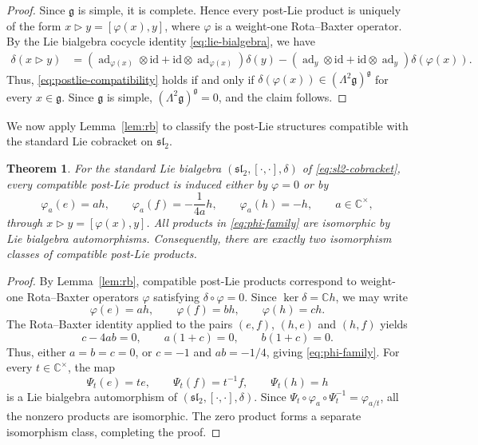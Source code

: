 \documentclass[11pt,english]{article}
\newcommand{\id}{\mathrm{id}}
\newcommand{\tri}{\mathbin{\triangleright}}
\newtheorem{theorem}[lemma]{Theorem}
\theoremstyle{definition}
\begin{document}
\begin{proof}
Since $\mathfrak g$ is simple, it is complete.
Hence every post-Lie product is uniquely of the form
$x\tri y=[\varphi(x),y]$, where $\varphi$ is a
weight-one Rota--Baxter operator.
By the Lie bialgebra cocycle identity
\eqref{eq:lie-bialgebra}, we have
\[
\begin{aligned}
\delta(x\tri y)
&=(\operatorname{ad}_{\varphi(x)}\otimes\id
+\id\otimes\operatorname{ad}_{\varphi(x)})
\delta(y)-
(\operatorname{ad}_y\otimes\id
+\id\otimes\operatorname{ad}_y)
\delta(\varphi(x)).
\end{aligned}
\]
Thus, \eqref{eq:postlie-compatibility} holds
if and only if
$\delta(\varphi(x))\in
(\Lambda^2\mathfrak g)^{\mathfrak g}$
for every $x\in\mathfrak g$.
Since $\mathfrak g$ is simple,
$(\Lambda^2\mathfrak g)^{\mathfrak g}=0$,
and the claim follows.
\end{proof}

We now apply Lemma~\ref{lem:rb} to classify
the post-Lie structures compatible with the
standard Lie cobracket on $\mathfrak{sl}_2$.

\begin{theorem}\label{thm:sl2-plb}
For the standard Lie bialgebra
$(\mathfrak{sl}_2,[\cdot,\cdot],\delta)$
of \eqref{eq:sl2-cobracket}, every compatible
post-Lie product is induced either by
$\varphi=0$ or by
\begin{equation}\label{eq:phi-family}
\varphi_a(e)=ah,\qquad
\varphi_a(f)=-\frac{1}{4a}h,\qquad
\varphi_a(h)=-h,
\qquad a\in\mathbb{C}^\times,
\end{equation}
through $x\tri y=[\varphi(x),y]$.
All products in \eqref{eq:phi-family}
are isomorphic by Lie bialgebra automorphisms.
Consequently, there are exactly two
isomorphism classes of compatible post-Lie
products.
\end{theorem}

\begin{proof}
By Lemma~\ref{lem:rb}, compatible post-Lie
products correspond to weight-one
Rota--Baxter operators $\varphi$ satisfying
$\delta\circ\varphi=0$.
Since $\ker\delta=\mathbb{C} h$, we may write
\[
\varphi(e)=ah,\qquad
\varphi(f)=bh,\qquad
\varphi(h)=ch.
\]
The Rota--Baxter identity applied to the pairs
$(e,f)$, $(h,e)$ and $(h,f)$ yields
\[
c-4ab=0,\qquad
a(1+c)=0,\qquad
b(1+c)=0.
\]
Thus, either $a=b=c=0$, or
$c=-1$ and $ab=-1/4$, giving
\eqref{eq:phi-family}.
For every $t\in\mathbb{C}^\times$, the map
\[
\Psi_t(e)=te,\qquad
\Psi_t(f)=t^{-1}f,\qquad
\Psi_t(h)=h
\]
is a Lie bialgebra automorphism of
$(\mathfrak{sl}_2,[\cdot,\cdot],\delta)$.
Since
$\Psi_t \circ \varphi_a \circ \Psi_t^{-1}=\varphi_{a/t}$,
all the nonzero products are isomorphic.
The zero product forms a separate
isomorphism class, completing the proof.
\end{proof}
\end{document}
